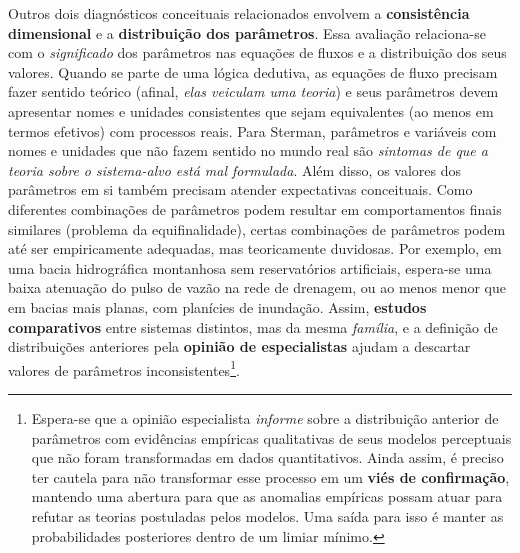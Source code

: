 \documentclass[./main.tex]{subfiles}
\begin{document}
\par Outros dois diagnósticos conceituais relacionados envolvem a \textbf{consistência dimensional} e a \textbf{distribuição dos parâmetros}. Essa avaliação relaciona-se com o \textit{significado} dos parâmetros nas equações de fluxos e a distribuição dos seus valores. Quando se parte de uma lógica dedutiva, as equações de fluxo precisam fazer sentido teórico (afinal, \textit{elas veiculam uma teoria}) e seus parâmetros devem apresentar nomes e unidades consistentes que sejam equivalentes (ao menos em termos efetivos) com processos reais. Para Sterman, parâmetros e variáveis com nomes e unidades que não fazem sentido no mundo real são \textit{sintomas de que a teoria sobre o sistema-alvo está mal formulada}. Além disso, os valores dos parâmetros em si também precisam atender expectativas conceituais. Como diferentes combinações de parâmetros podem resultar em comportamentos finais similares (problema da equifinalidade), certas combinações de parâmetros podem até ser empiricamente adequadas, mas teoricamente duvidosas. Por exemplo, em uma bacia hidrográfica montanhosa sem reservatórios artificiais, espera-se uma baixa atenuação do pulso de vazão na rede de drenagem, ou ao menos menor que em bacias mais planas, com planícies de inundação. Assim, \textbf{estudos comparativos} entre sistemas distintos, mas da mesma \textit{família}, e a definição de distribuições anteriores pela \textbf{opinião de especialistas} ajudam a descartar valores de parâmetros inconsistentes\footnote{Espera-se que a opinião especialista \textit{informe} sobre a distribuição anterior de parâmetros com evidências empíricas qualitativas de seus modelos perceptuais que não foram transformadas em dados quantitativos. Ainda assim, é preciso ter cautela para não transformar esse processo em um \textbf{viés de confirmação}, mantendo uma abertura para que as anomalias empíricas possam atuar para refutar as teorias postuladas pelos modelos. Uma saída para isso é manter as probabilidades posteriores dentro de um limiar mínimo.}. 
\end{document}
